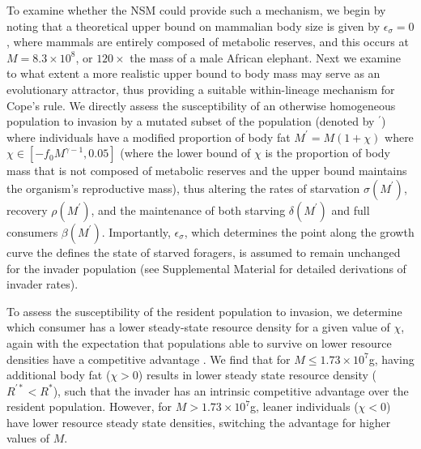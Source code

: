 \documentclass{pnastwo}
\newcommand{\sid}[1]{\textcolor{red}{\bf [#1]}}
\begin{document}
\begin{article}
To examine whether the NSM could provide such a mechanism, we begin by noting that a theoretical upper bound on mammalian body size is given by $\epsilon_\sigma=0$, where mammals are entirely composed of metabolic reserves, and this occurs at $M=8.3\times 10^8$, or $120\times$ the mass of a male African elephant.
Next we examine to what extent a more realistic upper bound to body mass may serve as an evolutionary attractor, thus providing a suitable within-lineage mechanism for Cope's rule.
We directly assess the susceptibility of an otherwise homogeneous population to invasion by a mutated subset of the population (denoted by ${}^\prime$) where individuals have a modified proportion of body fat $M^\prime=M(1+\chi)$ where $\chi \in [-f_0M^{\gamma-1},0.05]$ (where the lower bound of $\chi$ is the proportion of body mass that is not composed of metabolic reserves and the upper bound maintains the organism's reproductive mass), thus altering the rates of starvation $\sigma(M^\prime)$, recovery $\rho(M^\prime)$, and the maintenance of both starving $\delta(M^\prime)$ and full consumers $\beta(M^\prime)$.
Importantly, $\epsilon_\sigma$, which determines the point along the growth curve the defines the state of starved foragers, is assumed to remain unchanged for the invader population (see Supplemental Material for detailed derivations of invader rates).

To assess the susceptibility of the resident population to invasion, we determine which consumer has a lower steady-state resource density for a given value of $\chi$, again with the expectation that populations able to survive on lower resource densities have a competitive advantage \cite{tilman1981}.
We find that for $M\leq 1.73\times10^7$g, having additional body fat ($\chi > 0$) results in lower steady state resource density ($R^{\prime *}<R^*$), such that the invader has an intrinsic competitive advantage over the resident population.
However, for $M> 1.73\times10^7$g, leaner individuals ($\chi < 0$) have lower resource steady state densities, switching the advantage for higher values of $M$.



\end{article}
\end{document}
